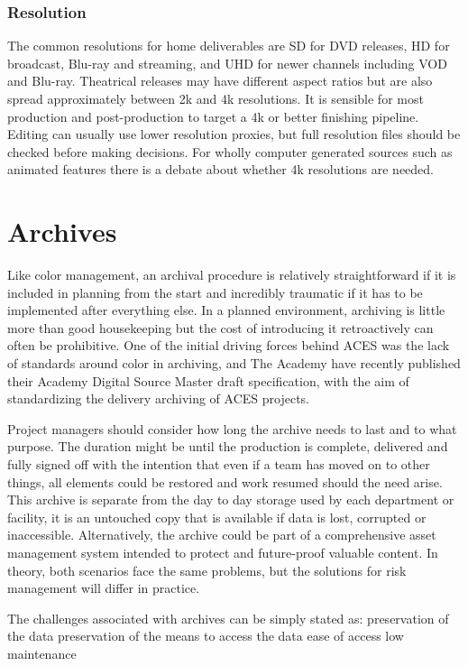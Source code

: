 \subsubsection{Resolution}

The common resolutions for home deliverables are SD for DVD releases, HD for broadcast, Blu-ray and streaming, and UHD for newer channels including VOD and Blu-ray. Theatrical releases may have different aspect ratios but are also spread approximately between 2k and 4k resolutions. It is sensible for most production and post-production to target a 4k or better finishing pipeline. Editing can usually use lower resolution proxies, but full resolution files should be checked before making decisions. For wholly computer generated sources such as animated features there is a debate about whether 4k resolutions are needed.

\section{Archives}

Like color management, an archival procedure is relatively straightforward if it is included in planning from the start and incredibly traumatic if it has to be implemented after everything else. In a planned environment, archiving is little more than good housekeeping but the cost of introducing it retroactively can often be prohibitive.  One of the initial driving forces behind ACES was the lack of standards around color in archiving, and The Academy have recently published their Academy Digital Source Master draft specification, with the aim of standardizing the delivery archiving of ACES projects.

Project managers should consider how long the archive needs to last and to what purpose. The duration might be until the production is complete, delivered and fully signed off with the intention that even if a team has moved on to other things, all elements could be restored and work resumed should the need arise. This archive is separate from the day to day storage used by each department or facility, it is an untouched copy that is available if data is lost, corrupted or inaccessible. Alternatively, the archive could be part of a comprehensive asset management system intended to protect and future-proof valuable content. In theory, both scenarios face the same problems, but the solutions for risk management will differ in practice.

The challenges associated with archives can be simply stated as:
preservation of the data
preservation of the means to access the data
ease of access
low maintenance


